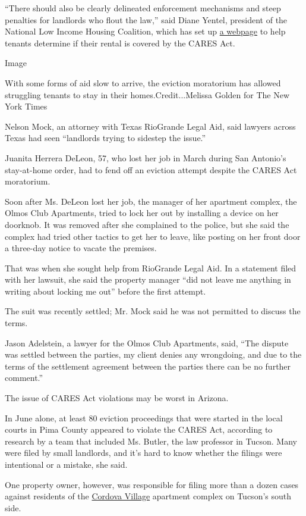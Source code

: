 ``There should also be clearly delineated enforcement mechanisms and
steep penalties for landlords who flout the law,'' said Diane Yentel,
president of the National Low Income Housing Coalition, which has set up
\href{https://nlihc.org/federal-moratoriums}{a webpage} to help tenants
determine if their rental is covered by the CARES Act.

Image

With some forms of aid slow to arrive, the eviction moratorium has
allowed struggling tenants to stay in their homes.Credit...Melissa
Golden for The New York Times

Nelson Mock, an attorney with Texas RioGrande Legal Aid, said lawyers
across Texas had seen ``landlords trying to sidestep the issue.''

Juanita Herrera DeLeon, 57, who lost her job in March during San
Antonio's stay-at-home order, had to fend off an eviction attempt
despite the CARES Act moratorium.

Soon after Ms. DeLeon lost her job, the manager of her apartment
complex, the Olmos Club Apartments, tried to lock her out by installing
a device on her doorknob. It was removed after she complained to the
police, but she said the complex had tried other tactics to get her to
leave, like posting on her front door a three-day notice to vacate the
premises.

That was when she sought help from RioGrande Legal Aid. In a statement
filed with her lawsuit, she said the property manager ``did not leave me
anything in writing about locking me out'' before the first attempt.

The suit was recently settled; Mr. Mock said he was not permitted to
discuss the terms.

Jason Adelstein, a lawyer for the Olmos Club Apartments, said, ``The
dispute was settled between the parties, my client denies any
wrongdoing, and due to the terms of the settlement agreement between the
parties there can be no further comment.''

The issue of CARES Act violations may be worst in Arizona.

In June alone, at least 80 eviction proceedings that were started in the
local courts in Pima County appeared to violate the CARES Act, according
to research by a team that included Ms. Butler, the law professor in
Tucson. Many were filed by small landlords, and it's hard to know
whether the filings were intentional or a mistake, she said.

One property owner, however, was responsible for filing more than a
dozen cases against residents of the
\href{https://www.equilibriumprops.com/cordova-village-apartments}{Cordova
Village} apartment complex on Tucson's south side.


